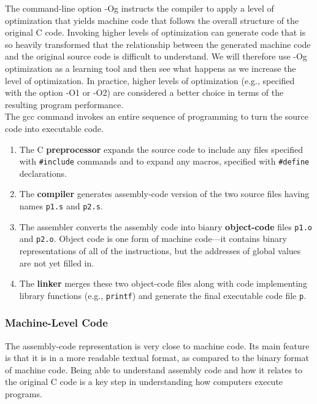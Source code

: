 \documentclass[11pt]{article}
\begin{document}
The command-line option -Og instructs the compiler to apply a level of optimization that yields machine code that follows the overall structure of the original C code. Invoking higher levels of optimization can generate code that is so heavily transformed that the relationship between the generated machine code and the original source code is difficult to understand. We will therefore use -Og optimization as a learning tool and then see what happens as we increase the level of optimization. In practice, higher levels of optimization (e.g., specified with the option -O1 or -O2) are considered a better choice in terms of the resulting program performance.\\

The gcc command invokes an entire sequence of programming to turn the source code into executable code.\\
\begin{enumerate}
\item The C \textbf{preprocessor} expands the source code to include any files specified with \texttt{\#include} commands and to expand any macros, specified with \texttt{\#define} declarations.\\
\item The \textbf{compiler} generates assembly-code version of the two source files having names \texttt{p1.s} and \texttt{p2.s}.\\
\item The assembler converts the assembly code into bianry \textbf{object-code} files \texttt{p1.o} and \texttt{p2.o}. Object code is one form of machine code—it contains binary representations of all of the instructions, but the addresses of global values are not yet filled in.\\
\item The \textbf{linker} merges these two object-code files along with code implementing library functions (e.g., \texttt{printf}) and generate the final executable code file \texttt{p}.\\
\end{enumerate}


\subsubsection{Machine-Level Code}
\label{sec:org50df7a6}
The assembly-code representation is very close to machine code. Its main feature is that it is in a more readable textual format, as compared to the binary format of machine code. Being able to understand assembly code and how it relates to the original C code is a key step in understanding how computers execute programs.\\
\end{document}
